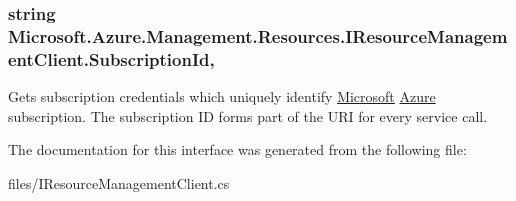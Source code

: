 \subsubsection[{\texorpdfstring{Subscription\+Id}{SubscriptionId}}]{\setlength{\rightskip}{0pt plus 5cm}string Microsoft.\+Azure.\+Management.\+Resources.\+I\+Resource\+Management\+Client.\+Subscription\+Id\hspace{0.3cm}{\ttfamily [get]}, {\ttfamily [set]}}\hypertarget{interface_microsoft_1_1_azure_1_1_management_1_1_resources_1_1_i_resource_management_client_a4291b13a43108062ff778b2550972ed4}{}\label{interface_microsoft_1_1_azure_1_1_management_1_1_resources_1_1_i_resource_management_client_a4291b13a43108062ff778b2550972ed4}


Gets subscription credentials which uniquely identify \hyperlink{namespace_microsoft}{Microsoft} \hyperlink{namespace_microsoft_1_1_azure}{Azure} subscription. The subscription ID forms part of the U\+RI for every service call. 



The documentation for this interface was generated from the following file\+:\begin{DoxyCompactItemize}
\item 
files/I\+Resource\+Management\+Client.\+cs\end{DoxyCompactItemize}
